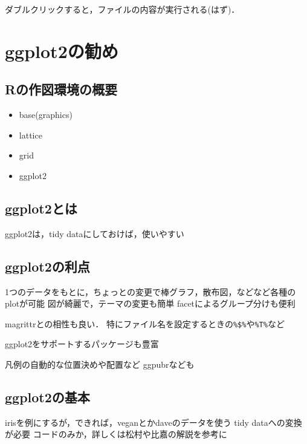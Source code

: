 \documentclass[
]{article}
\providecommand{\tightlist}{%
  \setlength{\itemsep}{0pt}\setlength{\parskip}{0pt}}
\begin{document}
ダブルクリックすると，ファイルの内容が実行される(はず)．

\hypertarget{ggplot2}{%
\section{ggplot2の勧め}\label{ggplot2}}

\hypertarget{rux306eux4f5cux56f3ux74b0ux5883ux306eux6982ux8981}{%
\subsection{Rの作図環境の概要}\label{rux306eux4f5cux56f3ux74b0ux5883ux306eux6982ux8981}}

\begin{itemize}
\tightlist
\item
  base(graphics)
\item
  lattice
\item
  grid
\item
  ggplot2
\end{itemize}

\hypertarget{ggplot2ux3068ux306f}{%
\subsection{ggplot2とは}\label{ggplot2ux3068ux306f}}

ggplot2は，tidy dataにしておけば，使いやすい

\hypertarget{ggplot2ux306eux5229ux70b9}{%
\subsection{ggplot2の利点}\label{ggplot2ux306eux5229ux70b9}}

1つのデータをもとに，ちょっとの変更で棒グラフ，散布図，などなど各種のplotが可能
図が綺麗で，テーマの変更も簡単
facetによるグループ分けも便利

magrittrとの相性も良い．
特にファイル名を設定するときの\texttt{\%\$\%}や\texttt{\%T\%}など

ggplot2をサポートするパッケージも豊富

凡例の自動的な位置決めや配置など
ggpubrなども

\hypertarget{ggplot2ux306eux57faux672c}{%
\subsection{ggplot2の基本}\label{ggplot2ux306eux57faux672c}}

irisを例にするが，できれば，veganとかdaveのデータを使う
tidy dataへの変換が必要
コードのみか，詳しくは松村や比嘉の解説を参考に
\end{document}
